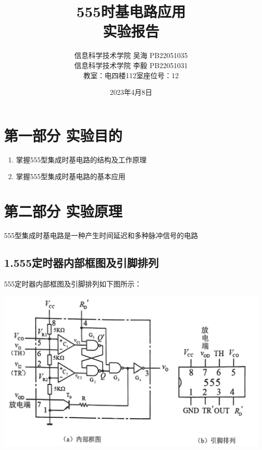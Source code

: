 \documentclass{ctexart}
\title{\Large 555时基电路应用\\{\large 实验报告}}
\author{\large  信息科学技术学院 \quad 吴海\MyFont{垚} PB22051035 \\\large  信息科学技术学院 \quad 李\quad 毅 PB22051031 \\{教室：电四楼112室\quad 座位号：12}}
\date{2023年4月8日}
\begin{document}
    \maketitle
    \thispagestyle{empty}
    
    \newpage 
    \setcounter{page}{1}

    \section*{第一部分 \quad 实验目的}

\begin{enumerate}
    \item 掌握555型集成时基电路的结构及工作原理
    \item 掌握555型集成时基电路的基本应用
\end{enumerate}

    \section*{第二部分 \quad 实验原理}
555型集成时基电路是一种产生时间延迟和多种脉冲信号的电路

\subsection*{1.555定时器内部框图及引脚排列}

555定时器内部框图及引脚排列如下图所示：

    \begin{minipage}[c]{\textwidth}
         \centering
         \includegraphics[width=\linewidth]{1.1.png}
        
    \end{minipage}
\end{document}
